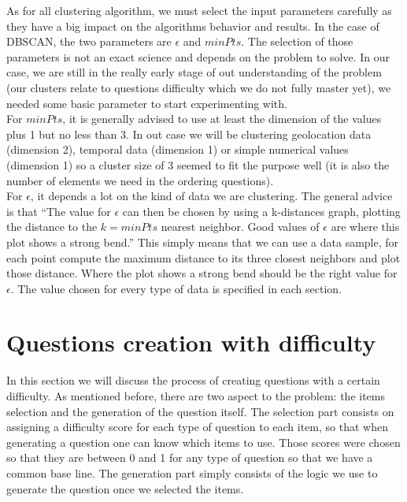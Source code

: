 As for all clustering algorithm, we must select the input parameters carefully as they have a big impact on the algorithms behavior and results. In the case of DBSCAN, the two parameters are $\epsilon$ and $minPts$. The selection of those parameters is not an exact science and depends on the problem to solve. In our case, we are still in the really early stage of out understanding of the problem (our clusters relate to questions difficulty which we do not fully master yet), we needed some basic parameter to start experimenting with.\\
For $minPts$, it is generally advised to use at least the dimension of the values plus 1 but no less than 3\cite{dbscan}. In out case we will be clustering geolocation data (dimension 2), temporal data (dimension 1) or simple numerical values (dimension 1) so a cluster size of 3 seemed to fit the purpose well (it is also the number of elements we need in the ordering questions).\\
For $\epsilon$, it depends a lot on the kind of data we are clustering. The general advice is that ``The value for $\epsilon$ can then be chosen by using a k-distances graph, plotting the distance to the $k = minPts$ nearest neighbor. Good values of $\epsilon$ are where this plot shows a strong bend.''\cite{dbscan} This simply means that we can use a data sample, for each point compute the maximum distance to its three closest neighbors and plot those distance. Where the plot shows a strong bend should be the right value for $\epsilon$. The value chosen for every type of data is specified in each section.

\section{Questions creation with difficulty}
In this section we will discuss the process of creating questions with a certain difficulty. As mentioned before, there are two aspect to the problem: the items selection and the generation of the question itself. The selection part consists on assigning a difficulty score for each type of question to each item, so that when generating a question one can know which items to use. Those scores were chosen so that they are between 0 and 1 for any type of question so that we have a common base line. The generation part simply consists of the logic we use to generate the question once we selected the items.
